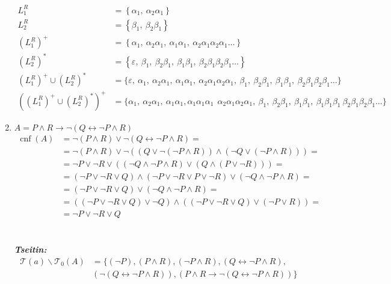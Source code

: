 \documentclass[a4paper,12pt]{article}
\DeclareMathOperator{\cnf}{cnf}
\begin{document}
\begin{enumerate}
	\begin{align*}
		L_1^R&=\left\{\alpha_1,\>\alpha_2\alpha_1\right\}\\
		L_2^R&=\left\{\beta_1,\>\beta_2\beta_1\right\}\\
		\left(L_1^R\right)^+&=\left\{\alpha_1,\>\alpha_2\alpha_1,\>\alpha_1\alpha_1,\>\alpha_2\alpha_1\alpha_2\alpha_1\dots\right\}\\
		\left(L_2^R\right)^*&=\left\{\varepsilon,\>\beta_1,\>\beta_2\beta_1,\>\beta_1\beta_1,\>\beta_2\beta_1\beta_2\beta_1\dots\right\}\\
		\left(L_1^R \right)^+\cup \left(L_2^R \right)^*&=\{\varepsilon,\>\alpha_1,\>\alpha_2\alpha_1,\>\alpha_1\alpha_1,\>\alpha_2\alpha_1\alpha_2\alpha_1,\>\beta_1,\>\beta_2\beta_1,\>\beta_1\beta_1,\>\beta_2\beta_1\beta_2\beta_1\dots \}\\
		\left(\left(L_1^R \right)^+\cup \left(L_2^R \right)^*\right)^+&=\{\alpha_1,\>\alpha_2\alpha_1,\>\alpha_1\alpha_1,\alpha_1\alpha_1\alpha_1\>\>\alpha_2\alpha_1\alpha_2\alpha_1,\>\beta_1,\>\beta_2\beta_1,\>\beta_1\beta_1,\>\beta_1\beta_1\beta_1\>\beta_2\beta_1\beta_2\beta_1\dots \}
	\end{align*}
	\item $A=P\land R\to\neg(Q\leftrightarrow\neg P\land R)$
		\begin{align*}
			\cnf(A)&=\neg(P\land R)\lor\neg(Q\leftrightarrow\neg P\land R)=\\&=\neg(P\land R)\lor\neg((Q\lor\neg(\neg P\land R))\land(\neg Q\lor(\neg P\land R)))=\\&=\neg P\lor\neg R\lor((\neg Q\land\neg P\land R)\lor (Q\land(P\lor\neg R)))=\\&=(\neg P\lor \neg R\lor Q)\land (\neg P\lor \neg R\lor P\lor\neg R)\lor (\neg Q\land\neg P\land R)=\\&=(\neg P\lor \neg R\lor Q)\lor (\neg Q\land\neg P\land R)=\\&=((\neg P\lor \neg R\lor Q)\lor\neg Q)\land((\neg P\lor \neg R\lor Q)\lor(\neg P\lor R))=\\&=\neg P\lor\neg R\lor Q
		\end{align*}
		\\\\\emph{\textbf{Tseitin:}}\\
		\begin{align*}
			\mathcal{T}(a)\backslash\mathcal{T}_0(A)&=\{(\neg P),(P\land R),(\neg P\land R),(Q\leftrightarrow\neg P\land R),\\&(\neg(Q\leftrightarrow\neg P\land R)),(P\land R\to\neg(Q\leftrightarrow\neg P\land R))\}

\end{align*}
\end{enumerate}
\end{document}
